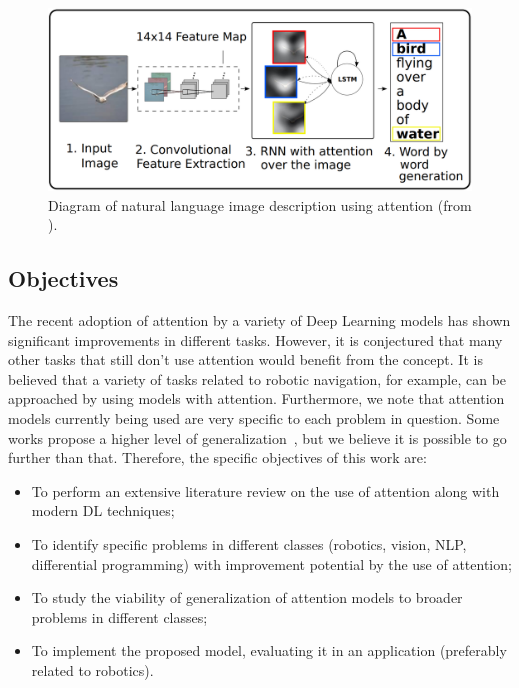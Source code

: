 \documentclass[article]{IEEEtran}
\begin{document}
\begin{figure}
\begin{center}
	\includegraphics[width=1.0\linewidth]{./img/img_captioning.png}
\caption{
    Diagram of natural language image description using attention
    (from \cite{ref:img-captioning}).
}
\label{fig:description}
\end{center}
\end{figure}

\subsection{Objectives}
The recent adoption of attention by a variety of Deep Learning models 
has shown significant improvements in different tasks.
However, it is conjectured that many other tasks that still don't use
attention would benefit from the concept.
It is believed that a variety of tasks related to robotic navigation,
for example, can be approached by using models with attention.
Furthermore, we note that attention models currently being used
are very specific to each problem in question.
Some works propose a higher level of generalization~\cite{ref:recurr-models},
but we believe it is possible to go further than that.
Therefore, the specific objectives of this work are:
\begin{itemize}
    \item To perform an extensive literature review on the use of attention
        along with modern DL techniques;
    \item To identify specific problems in different classes
        (robotics, vision, NLP, differential programming) with
        improvement potential by the use of attention;
    \item To study the viability of generalization of attention models
        to broader problems in different classes;
    \item To implement the proposed model, evaluating it in an
        application (preferably related to robotics).
\end{itemize}
\end{document}
